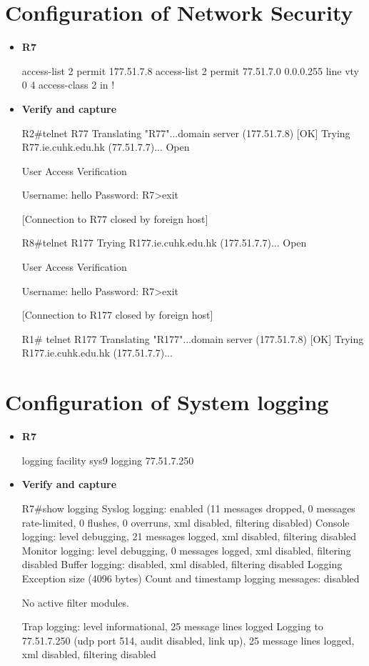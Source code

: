 \documentclass[10pt]{article}
\begin{document}
\section{Configuration of Network Security}
\begin{itemize}
\item {\bf R7}
\begin{verbatim*}
access-list 2 permit 177.51.7.8
access-list 2 permit 77.51.7.0 0.0.0.255
line vty 0 4
 access-class 2 in
!
\end{verbatim*}
\item {\bf Verify and capture}
\begin{verbatim*}
R2#telnet R77
Translating "R77"...domain server (177.51.7.8) [OK]
Trying R77.ie.cuhk.edu.hk (77.51.7.7)... Open


User Access Verification

Username: hello
Password:
R7>exit

[Connection to R77 closed by foreign host]

R8#telnet R177
Trying R177.ie.cuhk.edu.hk (177.51.7.7)... Open


User Access Verification

Username: hello
Password:
R7>exit

[Connection to R177 closed by foreign host]

R1# telnet R177
Translating "R177"...domain server (177.51.7.8) [OK]
Trying R177.ie.cuhk.edu.hk (177.51.7.7)...
% Connection refused by remote host
\end{verbatim*}
\end{itemize}
\section{Configuration of System logging}
\begin{itemize}
\item {\bf R7}
\begin{verbatim*}
logging facility sys9
logging 77.51.7.250
\end{verbatim*}
\item {\bf Verify and capture}
\begin{verbatim*}
R7#show logging
Syslog logging: enabled (11 messages dropped, 0 messages rate-limited,
                0 flushes, 0 overruns, xml disabled, filtering disabled)
    Console logging: level debugging, 21 messages logged, xml disabled,
                     filtering disabled
    Monitor logging: level debugging, 0 messages logged, xml disabled,
                     filtering disabled
    Buffer logging: disabled, xml disabled,
                    filtering disabled
    Logging Exception size (4096 bytes)
    Count and timestamp logging messages: disabled

No active filter modules.

    Trap logging: level informational, 25 message lines logged
        Logging to 77.51.7.250 (udp port 514, audit disabled, link up), 25 message lines logged, xml disabled,
               filtering disabled
\end{verbatim*}
\end{itemize}
\end{document}
